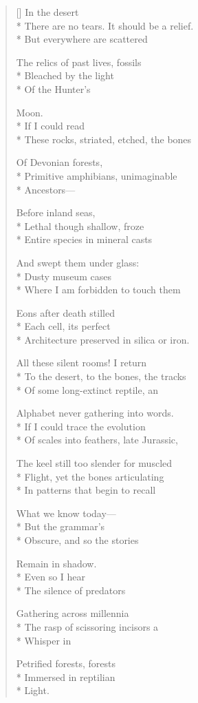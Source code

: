 \label{ch:petrified_forest}
\settowidth{\versewidth}{There are no tears. It should be a relief.}
\begin{verse}[\versewidth]
 \qquad  \qquad In the desert\\*
There are no tears. It should be a relief.\\*
But everywhere are scattered

The relics of past lives, fossils\\*
Bleached by the light\\*
Of the Hunter's

Moon.\\*
If I could read\\*
These rocks, striated, etched, the bones

Of Devonian forests,\\*
Primitive amphibians, unimaginable\\*
Ancestors---

 \qquad  \qquad Before inland seas,\\*
Lethal though shallow, froze\\*
Entire species in mineral casts

And swept them under glass:\\*
Dusty museum cases\\*
Where I am forbidden to touch them

Eons after death stilled\\*
Each cell, its perfect\\*
Architecture preserved in silica or iron.

All these silent rooms!  I return\\*
To the desert, to the bones, the tracks\\*
Of some long-extinct reptile, an

Alphabet never gathering into words.\\*
If I could trace the evolution\\*
Of scales into feathers, late Jurassic,

The keel still too slender for muscled \\*
Flight, yet the bones articulating\\*
In patterns that begin to recall

What we know today---\\*
 \qquad  \qquad  \qquad But the grammar's\\*
Obscure, and so the stories

Remain in shadow.\\*
Even so I hear\\*
The silence of predators

Gathering across millennia\\*
The rasp of scissoring incisors a\\*
Whisper in 

Petrified forests, forests\\*
Immersed in reptilian\\*
Light.
\end{verse}
